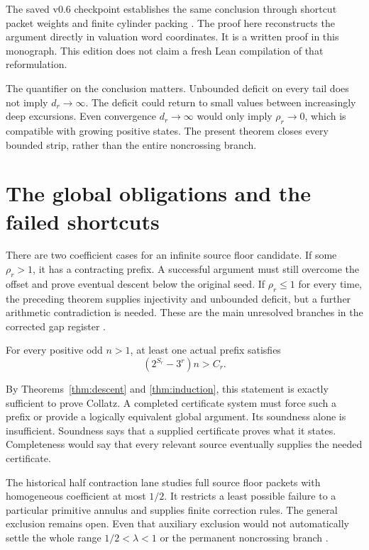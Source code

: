 The saved v0.6 checkpoint establishes the same conclusion through shortcut packet weights and finite cylinder packing \cite{projectcollatzbounded}. The proof here reconstructs the argument directly in valuation word coordinates. It is a written proof in this monograph. This edition does not claim a fresh Lean compilation of that reformulation.

The quantifier on the conclusion matters. Unbounded deficit on every tail does not imply $d_r\to\infty$. The deficit could return to small values between increasingly deep excursions. Even convergence $d_r\to\infty$ would only imply $\rho_r\to0$, which is compatible with growing positive states. The present theorem closes every bounded strip, rather than the entire noncrossing branch.

\section{The global obligations and the failed shortcuts}
There are two coefficient cases for an infinite source floor candidate. If some $\rho_r>1$, it has a contracting prefix. A successful argument must still overcome the offset and prove eventual descent below the original seed. If $\rho_r\le1$ for every time, the preceding theorem supplies injectivity and unbounded deficit, but a further arithmetic contradiction is needed. These are the main unresolved branches in the corrected gap register \cite{projectcollatzgap}.

\begin{conjecture}\label{conj:packetdescent}
For every positive odd $n>1$, at least one actual prefix satisfies
\[
\left(2^{S_r}-3^r\right)n>C_r.
\]
\end{conjecture}
By Theorems~\ref{thm:descent} and \ref{thm:induction}, this statement is exactly sufficient to prove Collatz. A completed certificate system must force such a prefix or provide a logically equivalent global argument. Its soundness alone is insufficient. Soundness says that a supplied certificate proves what it states. Completeness would say that every relevant source eventually supplies the needed certificate.

The historical half contraction lane studies full source floor packets with homogeneous coefficient at most $1/2$. It restricts a least possible failure to a particular primitive annulus and supplies finite correction rules. The general exclusion remains open. Even that auxiliary exclusion would not automatically settle the whole range $1/2<\lambda<1$ or the permanent noncrossing branch \cite{projectcollatzaudit,projectcollatzgap}.

